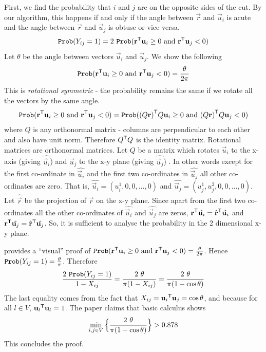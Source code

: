 \documentclass[12pt,
    driverfallback=dvipdfm,
 	openany,
    a4paper,
    toc=bibliography,
    twoside,
    numbers=noenddot]{article}              %
\begin{document}
First, we find the probability that $i$ and $j$ are on the opposite sides of the cut. By our algorithm, this happens if and only if the angle between $\vec r$ and $\vec u_i$ is acute and the angle between $\vec r$ and $\vec u_{j}$ is obtuse or vice versa.  
\[
\mathtt{Prob}(Y_{ij} = 1) = 2 ~\mathtt{Prob}({\mathbf r}^{\mathsf{T}} \mathbf u_i \geq 0 \text{ and } {\mathbf r}^{\mathsf{T}} \mathbf u_j < 0 )
\]
Let $\theta$ be the angle between vectors $\vec u_i$ and $\vec u_j$. We show the following
\[\mathtt{Prob}({\mathbf r}^{\mathsf{T}} \mathbf u_i \geq 0 \text{ and } {\mathbf r}^{\mathsf{T}} \mathbf u_j < 0 ) = \frac{\theta}{2 \pi} \]
This is \emph{rotational symmetric} - the probability remains the same if we rotate all the vectors by the same angle.  
\[\mathtt{Prob}({\mathbf r}^{\mathsf{T}} \mathbf u_i \geq 0 \text{ and } {\mathbf r}^{\mathsf{T}} \mathbf u_j < 0 ) = \mathtt{Prob}({(Q \mathbf r)}^{\mathsf{T}} Q \mathbf u_i \geq 0 \text{ and } {(Q \mathbf r)}^{\mathsf{T}} Q\mathbf u_j < 0 ) \]
where $Q$ is any orthonormal matrix - columns are perpendicular to each other and also have unit norm. Therefore ${Q}^{\mathsf{T}} Q$ is the identity matrix. Rotational matrices are orthonormal matrices. Let $Q$ be a matrix which rotates $\vec u_i$ to the x-axis (giving $\hat {\vec u_i}$) and $\vec u_j$ to the x-y plane (giving $\hat {\vec u_j}$) . In other words except for the first co-ordinate in $\hat {\vec u_i}$ and the first two co-ordinates in $\hat {\vec u_j}$ all other co-ordinates are zero. That is, $\hat {\vec u_i} = (u_i^1,0, 0, \dots, 0)$ and $\hat {\vec u_j} = (u_j^1, u_j^2, 0, 0, \dots, 0)$. Let $\hat{\vec r}$ be the projection of $\vec r$ on the x-y plane. Since apart from the first two co-ordinates all the other co-ordinates of $\hat {\vec u_i}$ and $\hat{\vec u_j}$ are zeros, ${\mathbf r}^{\mathsf{T}} \hat {\mathbf u_i} = {\hat{\mathbf r}}^{\mathsf{T}} \hat {\mathbf u_i}$ and ${\mathbf r}^{\mathsf{T}} \hat {\mathbf u_j} = {\hat{\mathbf r}}^{\mathsf{T}} \hat {\mathbf u_j}$. So, it is sufficient to analyse the probability in the 2 dimensional x-y plane.

 provides a ``visual'' proof of $\mathtt{Prob}({\mathbf r}^{\mathsf{T}} \mathbf u_i \geq 0 \text{ and } {\mathbf r}^{\mathsf{T}} \mathbf u_j < 0 ) = \frac{\theta}{2 \pi}$. 
Hence $\mathtt{Prob}(Y_{ij}=1) = \frac{\theta}{\pi}$. Therefore
\[ 
\frac{2~\mathtt{Prob}(Y_{ij} = 1)}{1-X_{ij}} = \frac{2~\theta}{\pi (1-X_{ij})} = \frac{2~\theta}{\pi (1-\cos \theta)}
\]
The last equality comes from the fact that $X_{ij} = {\mathbf u_i}^{\mathsf{T}} \mathbf u_j = \cos \theta$, and because for all $l \in V$, ${\mathbf u_l}^{\mathsf{T}} \mathbf u_l = 1$.
The paper \cite{goemans1} claims that basic calculus shows
\[
\min_{i,j \in V} \Big\{ \frac{2~\theta}{\pi (1-\cos \theta)} \Big\} > 0.878 
\]
This concludes the proof.

\end{document}

